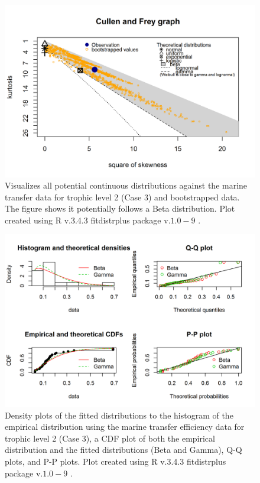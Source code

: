\documentclass[oneside,12pt,final]{sty/ucthesis-CA2012}
\let\cite\citep                             %
\begin{document}
\begin{mainmatter}
\begin{figure}[H]
     \centering
       \includegraphics[width=.8\textwidth]{fig/cullen_frey_te2}
    \caption{Visualizes all potential continuous distributions against the marine transfer data for trophic level 2 (Case 3) and bootstrapped data. The figure shows it potentially follows a Beta distribution. Plot created using R v.3.4.3 \cite{Rcite} fitdistrplus package v.$1.0-9$ \cite{fitdistrplus}. }
    \label{cf_te2}
\end{figure}

\begin{figure}[H]
     \centering
       \includegraphics[width=.8\textwidth]{fig/gof_te2}
    \caption{Density plots of the fitted distributions to the histogram of the empirical distribution using the marine transfer efficiency data for trophic level 2 (Case 3), a CDF plot of both the empirical distribution and the fitted distributions (Beta and Gamma), Q-Q plots, and P-P plots. Plot created using R v.3.4.3 \cite{Rcite} fitdistrplus package v.$1.0-9$ \cite{fitdistrplus}. }
    \label{gof_te2}
\end{figure}


\end{mainmatter}
\end{document}
